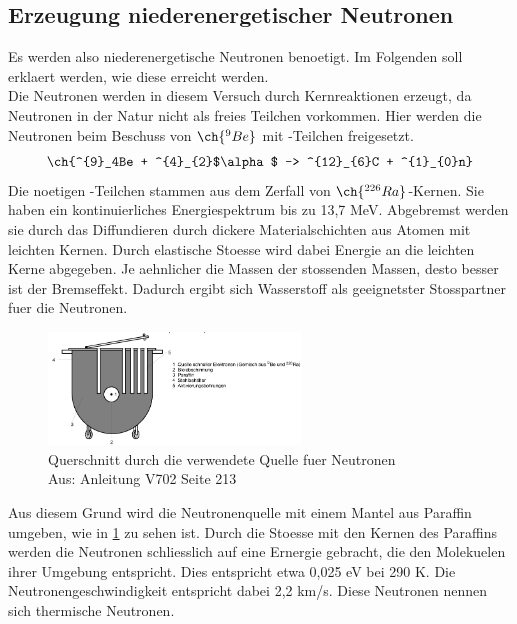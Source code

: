 \documentclass[titlepage=firstcover, captions=tableheading]{scrartcl}
\let\ce\ch
\begin{document}
\subsection{Erzeugung niederenergetischer Neutronen}
Es werden also niederenergetische Neutronen benoetigt. Im Folgenden soll erklaert werden, wie diese erreicht werden.\\
Die Neutronen werden in diesem Versuch durch Kernreaktionen erzeugt, da Neutronen in der Natur nicht als freies Teilchen vorkommen. Hier werden die Neutronen beim Beschuss von $\ce{^{9}Be}$ mit \alpha-Teilchen freigesetzt.
\begin{equation}
    \ce{^{9}_4Be + ^{4}_{2}$\alpha$ -> ^{12}_{6}C + ^{1}_{0}n} \nonumber
\end{equation}
Die noetigen \alpha-Teilchen stammen aus dem Zerfall von $ \ce{^{226}Ra}$-Kernen. Sie haben ein kontinuierliches Energiespektrum bis zu 13,7 MeV. Abgebremst werden sie durch das Diffundieren durch dickere Materialschichten aus Atomen mit leichten Kernen. Durch elastische Stoesse wird dabei Energie an die leichten Kerne abgegeben. Je aehnlicher die Massen der stossenden Massen, desto besser ist der Bremseffekt. Dadurch ergibt sich Wasserstoff als geeignetster Stosspartner fuer die Neutronen. 
\begin{figure}[H]
    \centering
    \includegraphics[width=0.6\textwidth]{"Quelle_Neutronen.png"}
    \caption{Querschnitt durch die verwendete Quelle fuer Neutronen\\Aus: Anleitung V702 Seite 213}
    \label{Fig:Quelle}
\end{figure}
\noindent Aus diesem Grund wird die Neutronenquelle mit einem Mantel aus Paraffin umgeben, wie in \ref{Fig:Quelle} zu sehen ist. Durch die Stoesse mit den Kernen des Paraffins werden die Neutronen schliesslich auf eine Ernergie gebracht, die den Molekuelen ihrer Umgebung entspricht. Dies entspricht etwa 0,025 eV bei 290 K. Die Neutronengeschwindigkeit entspricht dabei 2,2 km/s. Diese Neutronen nennen sich thermische Neutronen.
\end{document}
